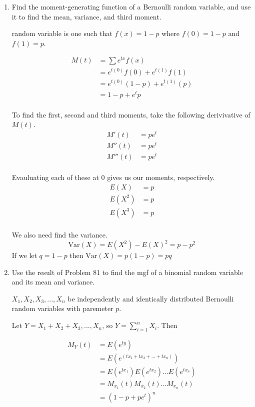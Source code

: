 \documentclass{tufte-book}
\newcommand{\Var}{\mathrm{Var}}
\theoremstyle{mytheoremstyle}
\theoremstyle{mylemstyle}
\theoremstyle{mydefstyle}
\begin{document}
\begin{enumerate}

\item Find the moment-generating function of a Bernoulli random variable, and use it to find the mean, variance, and third moment.

 random variable is one such that $f(x) = 1-p$ where $f(0) = 1-p$ and $f(1) = p$.

\begin{align*}
M(t) &= \sum e^{tx} f(x)\\
&= e^{t(0)}f(0) + e^{t(1)}f(1)\\
&= e^{t(0)}(1-p) + e^{t(1)}(p)\\
&= 1-p + e^tp\\
\end{align*}

To find the first, second and third moments, take the following derivivative of $M(t)$.
\begin{align*}
M'(t) &= pe^{t}\\
M''(t) &= pe^{t}\\
M'''(t) &= pe^{t}\\
\end{align*}

Evauluating each of these at $0$ gives us our moments, respectively.
\begin{align*}
E(X) &= p \\
E(X^2) &= p\\
E(X^3) &= p\\
\end{align*}

We also need find the variance.
\[ \Var(X) = E(X^2) - E(X)^2 = p - p^2 \]
If we let $q = 1-p$ then $\Var(X) = p(1-p) = pq$

\item Use the result of Problem 81 to find the mgf of a binomial random variable and its mean and variance.

 $X_1, X_2, X_3,...,X_n$ be independently and identically distributed Bernoulli random variables with paremeter $p$.

Let $Y=X_1+X_2+X_3,...,X_n$, so $Y=\sum_{i=1}^nX_i$.  Then

\begin{align*}
M_Y(t) &= E(e^{ty})\\
&= E(e^{(tx_1 + tx_2+...+tx_n)})\\
&= E(e^{tx_1})E(e^{tx_2})...E(e^{tx_n})\\
&= M_{x_1}(t)M_{x_2}(t)...M_{x_n}(t)\\
&= (1-p + pe^t)^n
\end{align*}


\end{enumerate}
\end{document}
